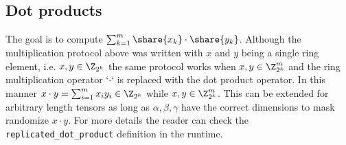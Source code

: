 \subsection{Dot products}


The goal is to compute $\sum_{k=1}^m \share{x_k} \cdot \share{y_k}$. Although
the multiplication protocol above was written with $x$ and $y$ being a single
ring element, i.e. $x,y \in \Z_{2^k}$ the same protocol works when $x, y \in
\Z^m_{2^k}$ and the ring multiplication operator `$\cdot$` is replaced with
the dot product operator. In this manner $x \cdot y = \sum_{i=1}^m x_i y_i \in
\Z_{2^k}$ while $x, y \in \Z^m_{2^k}$. This can be extended for arbitrary
length tensors as long as $\alpha, \beta, \gamma$ have the correct dimensions
to mask randomize $x \cdot y$. For more details the reader can check the
\verb|replicated_dot_product| definition in the runtime.




